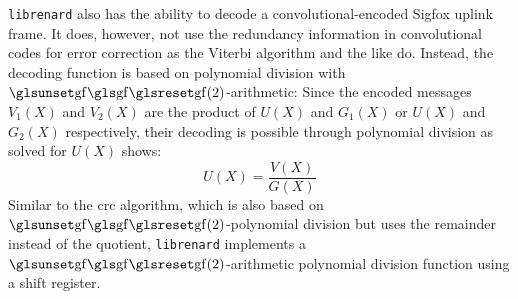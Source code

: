 \texttt{librenard} also has the ability to decode a convolutional-encoded Sigfox uplink frame.
It does, however, not use the redundancy information in convolutional codes for error correction as the Viterbi algorithm and the like do.
Instead, the decoding function is based on polynomial division with $\GF(2)$-arithmetic:
Since the encoded messages $V_1(X)$ and $V_2(X)$ are the product of $U(X)$ and $G_1(X)$ or $U(X)$ and $G_2(X)$ respectively, their decoding is possible through polynomial division as  solved for $U(X)$ shows:
\begin{equation}
	U(X) = \frac{V(X)}{G(X)}
\end{equation}
Similar to the \gls{crc} algorithm, which is also based on $\GF(2)$-polynomial division but uses the remainder instead of the quotient, \texttt{librenard} implements a $\GF(2)$-arithmetic polynomial division function using a shift register.

